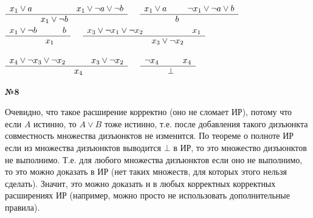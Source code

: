 \documentclass{article}
\newenvironment{task}{\begin{center}\fontsize{14}{14}\selectfont\bf}{\rm\fontsize{12}{12}\selectfont\end{center}}
\newcommand{\res}[3]{\begin{array}{lcr} #1 & & #2 \\ \hline & #3 \end{array}}
\begin{document}
	\begin{center}
		$\res{x_1 \vee a}{x_1 \vee \neg a \vee \neg b}{x_1 \vee \neg b}\quad$
		$\res{x_1 \vee a}{\neg x_1 \vee \neg a \vee b}{b}\quad$
		$\res{x_1 \vee \neg b}{b}{x_1}\quad$
		$\res{x_3 \vee \neg x_1 \vee \neg x_2}{x_1}{x_3 \vee \neg x_2}\quad$ \\ \vspace{5px}
		
		$\res{x_4 \vee \neg x_3 \vee \neg x_2}{x_3 \vee \neg x_2}{x_4}\quad$
		$\res{\neg x_4}{x_4}{\bot}\quad$
		
		
		
	\end{center}
	
	
	
	
	
	\begin{task} 
		№8
	\end{task}
	Очевидно, что такое расширение корректно (оно не сломает ИР), потому что если $A$ истинно, то $A \vee B$ тоже истинно, т.е. после добавления такого дизъюнкта совместность множества дизъюнктов не изменится. По теореме о полноте ИР если из множества дизъюнктов выводится $\bot$ в ИР, то это множество дизъюнктов не выполнимо. Т.е. для любого множества дизъюнктов если оно не выполнимо, то это можно доказать в ИР (нет таких множеств, для которых этого нельзя сделать). Значит, это можно доказать и в любых корректных корректных расширениях ИР (например, можно просто не использовать дополнительные правила).
	
	
	
	
	
	
	
	
	
	
	
	
	
	
	
	
	
	
	
	
	
	
	
	
	
\end{document}
